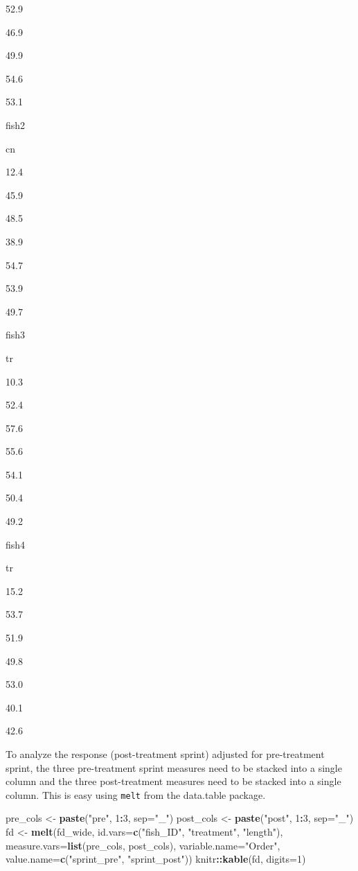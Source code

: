 \documentclass[]{book}
\newenvironment{Shaded}{\begin{snugshade}}{\end{snugshade}}
\newcommand{\DataTypeTok}[1]{\textcolor[rgb]{0.13,0.29,0.53}{#1}}
\newcommand{\DecValTok}[1]{\textcolor[rgb]{0.00,0.00,0.81}{#1}}
\newcommand{\KeywordTok}[1]{\textcolor[rgb]{0.13,0.29,0.53}{\textbf{#1}}}
\newcommand{\NormalTok}[1]{#1}
\newcommand{\OperatorTok}[1]{\textcolor[rgb]{0.81,0.36,0.00}{\textbf{#1}}}
\newcommand{\StringTok}[1]{\textcolor[rgb]{0.31,0.60,0.02}{#1}}
\begin{document}
52.9

46.9

49.9

54.6

53.1

fish2

cn

12.4

45.9

48.5

38.9

54.7

53.9

49.7

fish3

tr

10.3

52.4

57.6

55.6

54.1

50.4

49.2

fish4

tr

15.2

53.7

51.9

49.8

53.0

40.1

42.6

To analyze the response (post-treatment sprint) adjusted for pre-treatment sprint, the three pre-treatment sprint measures need to be stacked into a single column and the three post-treatment measures need to be stacked into a single column. This is easy using \texttt{melt} from the data.table package.

\begin{Shaded}
\begin{Highlighting}[]
\NormalTok{pre_cols <-}\StringTok{ }\KeywordTok{paste}\NormalTok{(}\StringTok{"pre"}\NormalTok{, }\DecValTok{1}\OperatorTok{:}\DecValTok{3}\NormalTok{, }\DataTypeTok{sep=}\StringTok{"_"}\NormalTok{)}
\NormalTok{post_cols <-}\StringTok{ }\KeywordTok{paste}\NormalTok{(}\StringTok{"post"}\NormalTok{, }\DecValTok{1}\OperatorTok{:}\DecValTok{3}\NormalTok{, }\DataTypeTok{sep=}\StringTok{"_"}\NormalTok{)}
\NormalTok{fd <-}\StringTok{ }\KeywordTok{melt}\NormalTok{(fd_wide,}
           \DataTypeTok{id.vars=}\KeywordTok{c}\NormalTok{(}\StringTok{"fish_ID"}\NormalTok{, }\StringTok{"treatment"}\NormalTok{, }\StringTok{"length"}\NormalTok{),}
           \DataTypeTok{measure.vars=}\KeywordTok{list}\NormalTok{(pre_cols, post_cols),}
           \DataTypeTok{variable.name=}\StringTok{"Order"}\NormalTok{,}
           \DataTypeTok{value.name=}\KeywordTok{c}\NormalTok{(}\StringTok{"sprint_pre"}\NormalTok{, }\StringTok{"sprint_post"}\NormalTok{))}
\NormalTok{knitr}\OperatorTok{::}\KeywordTok{kable}\NormalTok{(fd, }\DataTypeTok{digits=}\DecValTok{1}\NormalTok{)}
\end{Highlighting}
\end{Shaded}
\end{document}
